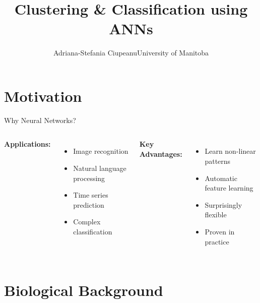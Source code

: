 \documentclass[aspectratio=169]{beamer}\usepackage[]{graphicx}\usepackage[]{xcolor}
\title{Clustering \& Classification using ANNs}
\author{\texorpdfstring{Adriana-Stefania Ciupeanu\newline University of Manitoba\newline}{Adriana-Stefania Ciupeanu}}
\date{}
\begin{document}


\section{Motivation}

\begin{frame}{Why Neural Networks?}

\begin{columns}
\textbf{Applications:}
\begin{itemize}
    \item Image recognition
    \item Natural language processing
    \item Time series prediction
    \item Complex classification
\end{itemize}

\textbf{Key Advantages:}
\begin{itemize}
    \item Learn non-linear patterns
    \item Automatic feature learning
    \item Surprisingly flexible
    \item Proven in practice
\end{itemize}
\end{columns}
\end{frame}


\section{Biological Background}
\end{document}
